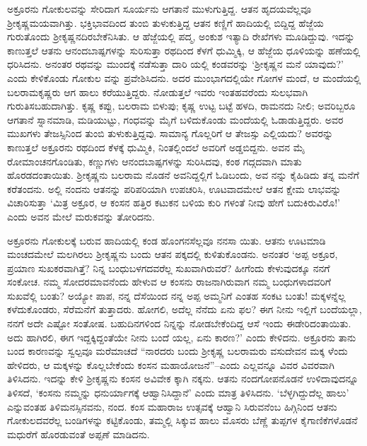 ಅಕ್ರೂರನು ಗೋಕುಲವನ್ನು ಸೇರಿದಾಗ ಸೂರ್ಯನು ಆಗತಾನೆ ಮುಳುಗುತ್ತಿದ್ದ. ಆತನ ಹೃದಯವೆಲ್ಲವೂ ಶ್ರೀಕೃಷ್ಣಮಯವಾಗಿತ್ತು. ಭಕ್ತಿಭಾವದಿಂದ ತುಂಬಿ ತುಳುಕುತ್ತಿದ್ದ ಆತನ ಕಣ್ಣಿಗೆ ಹಾದಿಯಲ್ಲಿ ಬಿದ್ದಿದ್ದ ಹೆಜ್ಜೆಯ ಗುರುತೊಂದು ಶ್ರೀಕೃಷ್ಣನದಿರಬೇಕೆನಿಸಿತು. ಆ ಹೆಜ್ಜೆಯಲ್ಲಿ ಪದ್ಮ, ಅಂಕುಶ ಇತ್ಯಾದಿ ರೇಖೆಗಳು ಮೂಡಿದ್ದುವು. ಇದನ್ನು ಕಾಣುತ್ತಲೆ ಆತನು ಆನಂದಬಾಷ್ಪಗಳನ್ನು ಸುರಿಸುತ್ತಾ ರಥದಿಂದ ಕೆಳಗೆ ಧುಮ್ಮಿಕ್ಕಿ, ಆ ಹೆಜ್ಜೆಯ ಧೂಳಿಯನ್ನು ಹಣೆಯಲ್ಲಿ ಧರಿಸಿದನು. ಅನಂತರ ರಥವನ್ನು ಮುಂದಕ್ಕೆ ನಡೆಸುತ್ತಾ ದಾರಿ ಯಲ್ಲಿ ಕಂಡವರನ್ನು ‘ಶ್ರೀಕೃಷ್ಣನ ಮನೆ ಯಾವುದು?’ ಎಂದು ಕೇಳಿಕೊಂಡು ಗೋಕುಲ ವನ್ನು ಪ್ರವೇಶಿಸಿದನು. ಅದರ ಮುಂಭಾಗದಲ್ಲಿಯೇ ಗೋಗಳ ಮಂದೆ, ಆ ಮಂದೆಯಲ್ಲಿ ಬಲರಾಮಕೃಷ್ಣರು ಆಗ ಹಾಲು ಕರೆಯುತ್ತಿದ್ದರು. ನೋಡುತ್ತಲೆ ಇವರು ಇಂತಹವರೆಂದು ಸುಲಭವಾಗಿ ಗುರುತಿಸಬಹುದಾಗಿತ್ತು. ಕೃಷ್ಣ ಕಪ್ಪು, ಬಲರಾಮ ಬಿಳುಪು; ಕೃಷ್ಣ ಉಟ್ಟ ಬಟ್ಟೆ ಹಳದಿ, ರಾಮನದು ನೀಲಿ; ಅವರಿಬ್ಬರೂ ಆಗತಾನೆ ಸ್ನಾನಮಾಡಿ, ಮಡಿಯುಟ್ಟು, ಗಂಧವನ್ನು ಮೈಗೆ ಬಳಿದುಕೊಂಡು ಮಂದೆಯಲ್ಲಿ ಓಡಾಡುತ್ತಿದ್ದರು. ಅವರ ಮುಖಗಳು ತೇಜಸ್ಸಿನಿಂದ ತುಂಬಿ ತುಳುಕುತ್ತಿದ್ದವು. ಸಾಮಾನ್ಯ ಗೊಲ್ಲರಿಗೆ ಆ ತೇಜಸ್ಸು ಎಲ್ಲಿಯದು? ಅವರನ್ನು ಕಾಣುತ್ತಲೆ ಅಕ್ರೂರನು ರಥದಿಂದ ಕೆಳಕ್ಕೆ ಧುಮ್ಮಿಕಿ, ನಿಂತಲ್ಲಿಂದಲೆ ಅವರಿಗೆ ಅಡ್ಡಬಿದ್ದನು. ಅವನ ಮೈ ರೋಮಾಂಚನಗೊಂಡಿತು, ಕಣ್ಣುಗಳು ಆನಂದಬಾಷ್ಪಗಳನ್ನು ಸುರಿಸಿದವು, ಕಂಠ ಗದ್ಗದವಾಗಿ ಮಾತು ಹೊರಡದಂತಾಯಿತು. ಶ್ರೀಕೃಷ್ಣನು ಬಲರಾಮ ನೊಡನೆ ಅವನಿದ್ದಲ್ಲಿಗೆ ಓಡಿಬಂದು, ಅವ ನನ್ನು ಕೈಹಿಡಿದು ತನ್ನ ಮನೆಗೆ ಕರೆತಂದನು. ಅಲ್ಲಿ ನಂದನು ಆತನನ್ನು ಪರಿಪರಿಯಾಗಿ ಉಪಚರಿಸಿ, ಊಟವಾದಮೇಲೆ ಆತನ ಕ್ಷೇಮ ಲಾಭವನ್ನು ವಿಚಾರಿಸುತ್ತಾ ‘ಮಿತ್ರ ಅಕ್ರೂರ, ಆ ಕಂಸನ ಹತ್ತಿರ ಕಟುಕನ ಬಳಿಯ ಕುರಿ ಗಳಂತೆ ನೀವು ಹೇಗೆ ಬದುಕಿರುವಿರೊ!’ ಎಂದು ಅವನ ಮೇಲೆ ಮರುಕವನ್ನು ತೋರಿದನು.

ಅಕ್ರೂರನು ಗೋಕುಲಕ್ಕೆ ಬರುವ ಹಾದಿಯಲ್ಲಿ ಕಂಡ ಹೊಂಗನಸೆಲ್ಲವೂ ನನಸಾ ಯಿತು. ಆತನು ಊಟಮಾಡಿ ಮಂಚದಮೇಲೆ ಮಲಗಿರಲು ಶ್ರೀಕೃಷ್ಣನು ಬಂದು ಆತನ ಪಕ್ಕದಲ್ಲಿ ಕುಳಿತುಕೊಂಡನು. ಅನಂತರ ‘ಅಪ್ಪ ಅಕ್ರೂರ, ಪ್ರಯಾಣ ಸುಖಕರವಾಗಿತ್ತೆ? ನಿನ್ನ ಬಂಧುಬಳಗದವರೆಲ್ಲ ಸುಖವಾಗಿರುವರೆ? ಹೀಗೆಂದು ಕೇಳುವುದಕ್ಕೂ ನನಗೆ ಸಂಕೋಚ. ನಮ್ಮ ಸೋದರಮಾವನೆಂದು ಹೇಳುವ ಆ ಕಂಸನು ರಾಜನಾಗಿರುವಾಗ ನಮ್ಮ ಬಂಧುಗಳಾದವರಿಗೆ ಸುಖವೆಲ್ಲಿ ಬಂತು? ಅಯ್ಯೋ ಪಾಪ, ನನ್ನ ದೆಸೆಯಿಂದ ನನ್ನ ಅಪ್ಪ ಅಮ್ಮನಿಗೆ ಎಂತಹ ಸಂಕಟ ಬಂತು! ಮಕ್ಕಳನ್ನೆಲ್ಲ ಕಳೆದುಕೊಂಡರು, ಸೆರೆಮನೆಗೆ ತುತ್ತಾದರು. ಹೋಗಲಿ, ಅದೆಲ್ಲ ನೆನೆದು ಏನು ಫಲ? ಈಗ ನೀನು ಇಲ್ಲಿಗೆ ಬಂದೆಯಲ್ಲಾ, ನನಗೆ ಅದೇ ಎಷ್ಟೋ ಸಂತೋಷ. ಬಹುದಿನಗಳಿಂದ ನಿನ್ನನ್ನು ನೋಡಬೇಕೆಂದಿದ್ದ ಆಸೆ ಇಂದು ಈಡೇರಿದಂತಾಯಿತು. ಅದು ಹಾಗಿರಲಿ, ಈಗ ಇದ್ದಕ್ಕಿದ್ದಂತೆಯೇ ನೀನು ಬಂದೆ ಯಲ್ಲ, ಏನು ಕಾರಣ?’ ಎಂದು ಕೇಳಿದನು. ಅಕ್ರೂರನು ತಾನು ಬಂದ ಕಾರಣವನ್ನು ಸ್ವಲ್ಪವೂ ಮರೆಮಾಚದೆ “ನಾರದರು ಬಂದು ಶ್ರೀಕೃಷ್ಣ ಬಲರಾಮರು ವಸುದೇವನ ಮಕ್ಕ ಳೆಂದು ಹೇಳಿದರು, ಆ ಮಕ್ಕಳನ್ನು ಕೊಲ್ಲಬೇಕೆಂದು ಕಂಸನ ಮಹಾಯೋಜನೆ”–ಎಂದು ಎಲ್ಲವನ್ನೂ ವಿವರ ವಿವರವಾಗಿ ತಿಳಿಸಿದನು. ಇದನ್ನು ಕೇಳಿ ಶ್ರೀಕೃಷ್ಣನು ಕಂಸನ ಅವಿವೇಕ ಕ್ಕಾಗಿ ನಕ್ಕನು. ಆತನು ನಂದಗೋಪನೊಡನೆ ಉಳಿದಾವುದನ್ನೂ ತಿಳಿಸದೆ, ‘ಕಂಸನು ನಮ್ಮನ್ನು ಧನುರ್ಯಾಗಕ್ಕೆ ಆಹ್ವಾನಿಸಿದ್ದಾನೆ’ ಎಂದು ಮಾತ್ರ ತಿಳಿಸಿದನು. ‘ಬೆಳ್ಳಗಿದ್ದುದೆಲ್ಲ ಹಾಲು’ ಎನ್ನುವಂತಹ ತಿಳಿಮನಸ್ಸಿನವನು, ನಂದ. ಕಂಸ ಮಹಾರಾಜ ಉತ್ಸವಕ್ಕೆ ಆಹ್ವಾನಿ ಸಿರುವನೆಂಬ ಹಿಗ್ಗಿನಿಂದ ಆತನು ಗೋಕುಲದವರೆಲ್ಲ ಬಂಡಿಗಳನ್ನು ಕಟ್ಟಿಕೊಂಡು, ತಮ್ಮಲ್ಲಿ ಸಿಕ್ಕುವ ಹಾಲು ಮೊಸರು ಬೆಣ್ಣೆ ತುಪ್ಪಗಳ ಕೈಗಾಣಿಕೆಗಳೊಡನೆ ಮಧುರೆಗೆ ಹೊರಡುವಂತೆ ಅಪ್ಪಣೆ ಮಾಡಿದನು.

